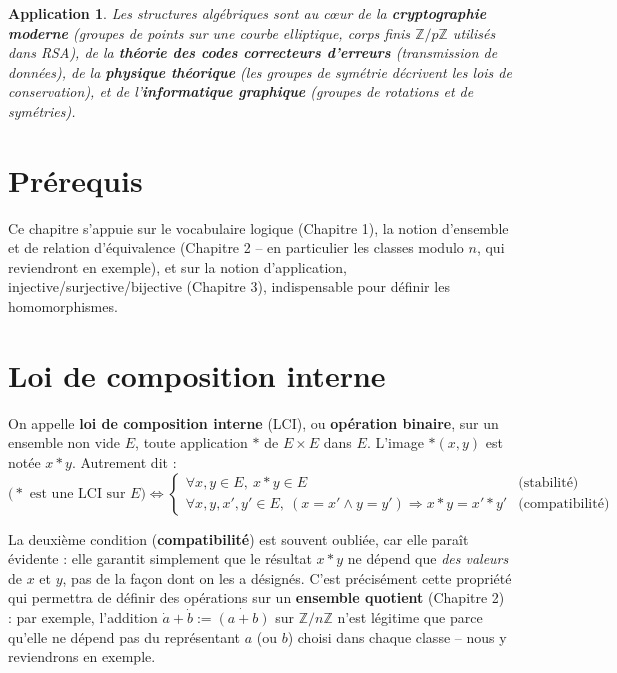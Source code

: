 \documentclass[a4paper,12pt,openany]{book}
\newtheorem{application}{Application}[section]
\begin{document}
\begin{application}
Les structures algébriques sont au c\oe ur de la \textbf{cryptographie
moderne} (groupes de points sur une courbe elliptique, corps finis
$\mathbb{Z}/p\mathbb{Z}$ utilisés dans RSA), de la \textbf{théorie des codes
correcteurs d'erreurs} (transmission de données), de la \textbf{physique
théorique} (les groupes de symétrie décrivent les lois de conservation), et
de l'\textbf{informatique graphique} (groupes de rotations et de
symétries).
\end{application}

\section{Prérequis}

Ce chapitre s'appuie sur le vocabulaire logique (Chapitre 1), la notion
d'ensemble et de relation d'équivalence (Chapitre 2 -- en particulier les
classes modulo $n$, qui reviendront en exemple), et sur la notion
d'application, injective/surjective/bijective (Chapitre 3), indispensable
pour définir les homomorphismes.

\section{Loi de composition interne}


\begin{definition}[4.1]
On appelle \textbf{loi de composition interne} (LCI), ou \textbf{opération
binaire}, sur un ensemble non vide $E$, toute application $*$ de $E\times E$
dans $E$. L'image $*(x,y)$ est notée $x*y$. Autrement dit :
\[
\big(* \text{ est une LCI sur } E\big) \iff
\begin{cases}
\forall x,y \in E,\ x*y \in E & \text{(stabilité)}\\
\forall x,y,x',y' \in E,\ (x=x' \wedge y=y') \Rightarrow x*y=x'*y' &
\text{(compatibilité)}
\end{cases}
\]
\end{definition}

\begin{remarque}
La deuxième condition (\textbf{compatibilité}) est souvent oubliée, car elle
paraît évidente : elle garantit simplement que le résultat $x*y$ ne dépend
que \emph{des valeurs} de $x$ et $y$, pas de la façon dont on les a
désignés. C'est précisément cette propriété qui permettra de définir des
opérations sur un \textbf{ensemble quotient} (Chapitre 2) : par exemple,
l'addition $\dot a + \dot b := \dot{(a+b)}$ sur $\mathbb{Z}/n\mathbb{Z}$
n'est légitime que parce qu'elle ne dépend pas du représentant $a$ (ou $b$)
choisi dans chaque classe -- nous y reviendrons en exemple.
\end{remarque}
\end{document}
